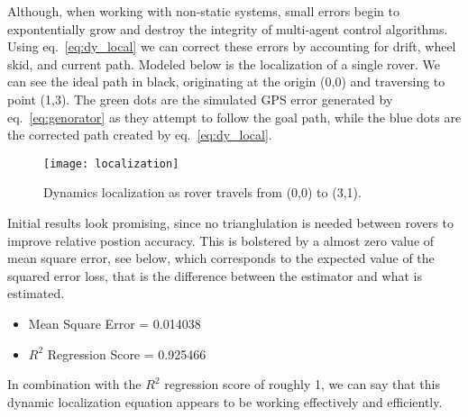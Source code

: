 Although, when working with non-static systems, small errors begin to expontentially grow and destroy the integrity of multi-agent control algorithms. Using eq.~\ref{eq:dy_local} we can correct these errors by accounting for drift, wheel skid, and current path. Modeled below is the localization of a single rover. We can see the ideal path  in black, originating at the origin (0,0) and traversing to point (1,3). The green dots are the simulated GPS error generated by eq.~\ref{eq:genorator} as they attempt to follow the goal path, while the blue dots are the corrected path created by eq.~\ref{eq:dy_local}.

\begin{figure} 
	\centering
	\texttt{[image: localization]}
	\caption{Dynamics localization as rover travels from (0,0) to (3,1).}
	\label{fig:dynamic}
\end{figure}

Initial results look promising, since no trianglulation is needed between rovers to improve relative postion accuracy. This is bolstered by a almost zero value of mean square error, see below, which corresponds to the expected value of the squared error loss, that is the difference between the estimator and what is estimated. 

\begin{itemize}
	\item Mean Square Error = 0.014038
	\item $R^2$ Regression Score = 0.925466
\end{itemize}

In combination with the $R^2$ regression score of roughly 1, we can say that this dynamic localization equation appears to be working effectively and efficiently. 
